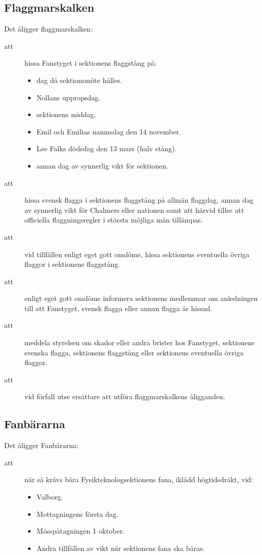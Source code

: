 \documentclass[a4paper]{article}
\begin{document}
\begin{foreningenv}{\forening{}}
    \subsection{Flaggmarskalken}
    Det åligger flaggmarskalken:
    \begin{description}
        \item[att] hissa Fanstyget i sektionens flaggstång på:
        \begin{itemize}
            \item dag då sektionsmöte hålles.
            \item Nollans uppropsdag.
            \item sektionens middag. %
            \item Emil och Emilias namnsdag den 14 november.
            \item Lee Falks dödsdag den 13 mars (halv stång).
            \item annan dag av synnerlig vikt för sektionen.
        \end{itemize}
        \item[att] hissa svensk flagga i sektionens flaggstång på allmän flaggdag, annan dag av synnerlig vikt för Chalmers eller nationen samt att härvid tillse att officiella flaggningsregler i största möjliga mån tillämpas.
        \item[att] vid tillfällen enligt eget gott omdöme, hissa sektionens eventuella övriga flaggor i sektionens flaggstång.
        \item[att] %
        enligt eget gott omdöme %
        informera sektionens medlemmar om anledningen till att Fanstyget, svensk flagga eller annan flagga är hissad.
        \item[att] meddela styrelsen om skador eller andra brister hos Fanstyget, sektionens svenska flagga, sektionens flaggstång eller sektionens eventuella övriga flaggor.
        \item[att] vid förfall utse ersättare att utföra flaggmarskalkens åligganden.
    \end{description}
    
    \subsection{Fanbärarna}
    Det åligger Fanbärarna:
    \begin{description}
        \item[att] när så krävs bära Fysikteknologsektionens fana, iklädd högtidsdräkt, vid:
        \begin{itemize}
    	    \item Valborg.
    	    \item Mottagningens första dag.
    	    \item Mösspåtagningen 1 oktober.
    	    \item Andra tillfällen av vikt när sektionens fana ska bäras.
    	\end{itemize}
    \end{description}
\end{foreningenv}
\end{document}
